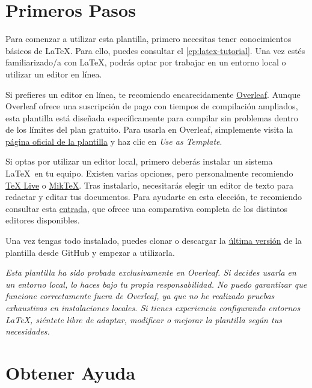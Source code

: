 {\section{Primeros Pasos}

Para comenzar a utilizar esta plantilla, primero necesitas tener conocimientos básicos de \LaTeX. Para ello, puedes consultar el \autoref{cp:latex-tutorial}. Una vez estés familiarizado/a con \LaTeX, podrás optar por trabajar en un entorno local o utilizar un editor en línea.

Si prefieres un editor en línea, te recomiendo encarecidamente \href{https://www.overleaf.com/}{Overleaf}. Aunque Overleaf ofrece una suscripción de pago con tiempos de compilación ampliados, esta plantilla está diseñada específicamente para compilar sin problemas dentro de los límites del plan gratuito. Para usarla en Overleaf, simplemente visita la \href{https://www.overleaf.com/latex/templates/unofficial-polytechnic-university-of-leiria-estg-thesis-slash-report-template/tqgbrncfhwgt}{página oficial de la plantilla} y haz clic en \textit{Use as Template}.

Si optas por utilizar un editor local, primero deberás instalar un sistema \LaTeX~en tu equipo. Existen varias opciones, pero personalmente recomiendo \href{https://www.tug.org/texlive/}{TeX Live} o \href{https://miktex.org/}{MikTeX}. Tras instalarlo, necesitarás elegir un editor de texto para redactar y editar tus documentos. Para ayudarte en esta elección, te recomiendo consultar esta \href{https://tex.stackexchange.com/questions/339/latex-editors-ides}{entrada}, que ofrece una comparativa completa de los distintos editores disponibles.

Una vez tengas todo instalado, puedes clonar o descargar la \href{https://github.com/enriiquee/umu-thesis}{última versión} de la plantilla desde GitHub y empezar a utilizarla.

\begin{block}[warning]
\textit{Esta plantilla ha sido probada exclusivamente en Overleaf. Si decides usarla en un entorno local, lo haces bajo tu propia responsabilidad. No puedo garantizar que funcione correctamente fuera de Overleaf, ya que no he realizado pruebas exhaustivas en instalaciones locales. Si tienes experiencia configurando entornos \LaTeX, siéntete libre de adaptar, modificar o mejorar la plantilla según tus necesidades.}
\end{block}

\section{Obtener Ayuda}

}
